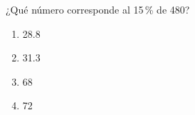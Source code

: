 \begin{problem}
    ¿Qué número corresponde al 15\,\% de 480?

    \begin{enumerate}[label=\Alph*.]
        \item 28.8
        \item 31.3
        \item 68
        \item 72
    \end{enumerate}
\end{problem}
